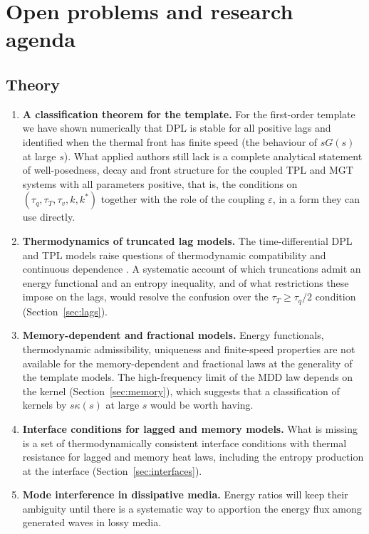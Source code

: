 \section{Open problems and research agenda}\label{sec:open}
\subsection{Theory}
\begin{enumerate}
\item \textbf{A classification theorem for the template.} For the first-order template we have shown numerically that DPL is stable for all positive lags and identified when the thermal front has finite speed (the behaviour of $sG(s)$ at large $s$). What applied authors still lack is a complete analytical statement of well-posedness, decay and front structure for the coupled TPL and MGT systems with all parameters positive, that is, the conditions on $(\tau_q,\tau_T,\tau_v,k,k^*)$ together with the role of the coupling $\varepsilon$, in a form they can use directly.
\item \textbf{Thermodynamics of truncated lag models.} The time-differential DPL and TPL models raise questions of thermodynamic compatibility and continuous dependence \citep{Chirita2016,Tibullo2017}. A systematic account of which truncations admit an energy functional and an entropy inequality, and of what restrictions these impose on the lags, would resolve the confusion over the $\tau_T\ge\tau_q/2$ condition (Section~\ref{sec:lags}).
\item \textbf{Memory-dependent and fractional models.} Energy functionals, thermodynamic admissibility, uniqueness and finite-speed properties are not available for the memory-dependent and fractional laws at the generality of the template models. The high-frequency limit of the MDD law depends on the kernel (Section~\ref{sec:memory}), which suggests that a classification of kernels by $s\kappa(s)$ at large $s$ would be worth having.
\item \textbf{Interface conditions for lagged and memory models.} What is missing is a set of thermodynamically consistent interface conditions with thermal resistance for lagged and memory heat laws, including the entropy production at the interface (Section~\ref{sec:interfaces}).
\item \textbf{Mode interference in dissipative media.} Energy ratios will keep their ambiguity until there is a systematic way to apportion the energy flux among generated waves in lossy media.
\end{enumerate}
